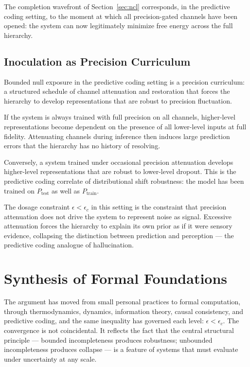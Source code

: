 \documentclass[11pt]{article}
\theoremstyle{remark}
\begin{document}
The completion wavefront of Section~\ref{sec:ncl} corresponds, in the predictive coding setting, to the moment at which all precision-gated channels have been opened: the system can now legitimately minimize free energy across the full hierarchy.

\subsection{Inoculation as Precision Curriculum}

Bounded null exposure in the predictive coding setting is a precision curriculum: a structured schedule of channel attenuation and restoration that forces the hierarchy to develop representations that are robust to precision fluctuation.

If the system is always trained with full precision on all channels, higher-level representations become dependent on the presence of all lower-level inputs at full fidelity. Attenuating channels during inference then induces large prediction errors that the hierarchy has no history of resolving.

Conversely, a system trained under occasional precision attenuation develops higher-level representations that are robust to lower-level dropout. This is the predictive coding correlate of distributional shift robustness: the model has been trained on $P_{\text{test}}$ as well as $P_{\text{train}}$.

The dosage constraint $\epsilon < \epsilon_c$ in this setting is the constraint that precision attenuation does not drive the system to represent noise as signal. Excessive attenuation forces the hierarchy to explain its own prior as if it were sensory evidence, collapsing the distinction between prediction and perception --- the predictive coding analogue of hallucination.

\section{Synthesis of Formal Foundations}
\label{sec:synthesis_formal}

The argument has moved from small personal practices to formal computation, through thermodynamics, dynamics, information theory, causal consistency, and predictive coding, and the same inequality has governed each level: $\epsilon < \epsilon_c$. The convergence is not coincidental. It reflects the fact that the central structural principle --- bounded incompleteness produces robustness; unbounded incompleteness produces collapse --- is a feature of systems that must evaluate under uncertainty at any scale.
\end{document}
